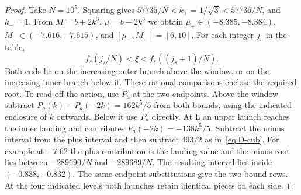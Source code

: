 \begin{proof}
Take $N=10^5$. Squaring gives $57735/N<k_+=1/\sqrt3<57736/N$,
and $k_-=1$. From $M=b+2k^3$, $\mu=b-2k^3$ we obtain
$\mu_+\in(-8.385,-8.384)$, $M_+\in(-7.616,-7.615)$, and
$[\mu_-,M_-]=[6,10]$. For each integer $j_s$ in the table,
\[
 f_s(j_s/N)<\xi<f_s((j_s+1)/N).
\]
Both ends lie on the increasing outer branch above the window, or on
the increasing inner branch below it. These rational comparisons
enclose the required root. To read off the action, use $P_a$ at the two
endpoints. Above the window subtract
$P_a(k)-P_a(-2k)=162k^5/5$ from both bounds, using the indicated
enclosure of $k$ outwards. Below it use $P_a$ directly. At L an upper
launch reaches the inner landing and contributes $P_a(-2k)=-138k^5/5$.
Subtract the minus interval from the plus interval and then subtract
$493/2$ as in~\eqref{eq:D-cub}. For example at $-7.62$ the plus
contribution is the landing value and the minus root lies between
$-289690/N$ and $-289689/N$. The resulting interval lies inside
$(-0.838,-0.832)$. The same endpoint substitutions give the two bound
rows. At the four indicated levels both launches retain identical
pieces on each side.
\end{proof}
